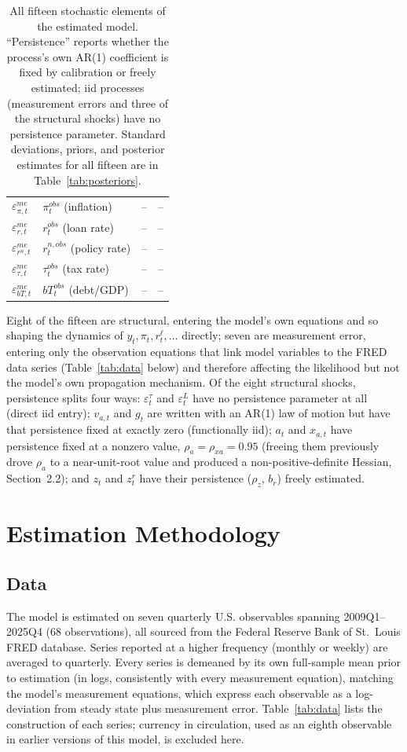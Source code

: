 \documentclass[11pt]{article}
\begin{document}
\begin{table}[h]
\begin{tabular}{@{}llll@{}}
$\varepsilon^{me}_{\pi,t}$  & $\pi^{obs}_t$ (inflation)         & -- & -- \\
$\varepsilon^{me}_{r,t}$    & $r^{obs}_t$ (loan rate)           & -- & -- \\
$\varepsilon^{me}_{r^n,t}$  & $r^{n,obs}_t$ (policy rate)       & -- & -- \\
$\varepsilon^{me}_{\tau,t}$ & $\tau^{obs}_t$ (tax rate)         & -- & -- \\
$\varepsilon^{me}_{bT,t}$   & $bT^{obs}_t$ (debt/GDP)           & -- & -- \\
\bottomrule
\end{tabular}
\caption{All fifteen stochastic elements of the estimated model.
``Persistence'' reports whether the process's own AR(1) coefficient is
fixed by calibration or freely estimated; iid processes (measurement
errors and three of the structural shocks) have no persistence
parameter. Standard deviations, priors, and posterior estimates for all
fifteen are in Table~\ref{tab:posteriors}.}
\label{tab:shocks}
\end{table}

Eight of the fifteen are structural, entering the model's own equations
and so shaping the dynamics of $y_t,\pi_t,r^\ell_t,\ldots$ directly;
seven are measurement error, entering only the observation equations
that link model variables to the FRED data series (Table~\ref{tab:data}
below) and therefore affecting the likelihood but not the model's own
propagation mechanism. Of the eight structural shocks, persistence
splits four ways: $\varepsilon^\tau_t$ and $\varepsilon^L_t$ have no
persistence parameter at all (direct iid entry); $v_{a,t}$ and $g_t$
are written with an AR(1) law of motion but have that persistence fixed
at exactly zero (functionally iid); $a_t$ and $x_{a,t}$ have persistence
fixed at a nonzero value, $\rho_a=\rho_{xa}=0.95$ (freeing them
previously drove $\rho_a$ to a near-unit-root value and produced a
non-positive-definite Hessian, Section~2.2); and $z_t$ and $z^r_t$ have
their persistence ($\rho_z$, $b_r$) freely estimated.

\section{Estimation Methodology}

\subsection{Data}
\label{sec:data}
The model is estimated on seven quarterly U.S. observables spanning
2009Q1--2025Q4 (68 observations), all sourced from the Federal Reserve
Bank of St.\ Louis FRED database. Series reported at a higher frequency
(monthly or weekly) are averaged to quarterly. Every series is demeaned
by its own full-sample mean prior to estimation (in logs, consistently
with every measurement equation), matching the model's measurement
equations, which express each observable as a log-deviation from steady
state plus measurement error. Table~\ref{tab:data} lists the
construction of each series; currency in circulation, used as an eighth
observable in earlier versions of this model, is excluded here.
\end{document}
